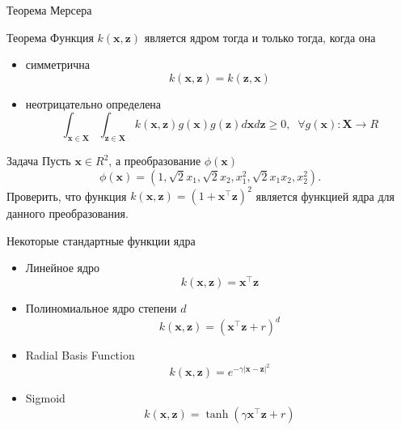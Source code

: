 \documentclass[aspectratio=169]{beamer}
\begin{document}
\begin{frame}{Теорема Мерсера}

\begin{alertblock}{Теорема}
Функция $k(\mathbf x, \mathbf z)$ является ядром тогда и только тогда, когда она 
\begin{itemize}
\item симметрична 
\[
k(\mathbf x, \mathbf z) = k(\mathbf z, \mathbf x)
\]
\item неотрицательно определена
\[
\int_{\mathbf x \in \mathbf X} \int_{\mathbf z \in \mathbf X} k(\mathbf x, \mathbf z) g(\mathbf x) g(\mathbf z) d\mathbf x d\mathbf z \geqslant 0, \;\; \forall g(\mathbf{x}): \mathbf{X} \rightarrow R
\]
\end{itemize}
\end{alertblock}

\begin{block}{Задача}
Пусть $\mathbf x \in R^2$, а преобразование $\phi(\mathbf{x})$
\[
\phi(\mathbf{x}) = (1, \sqrt{2} x_1, \sqrt{2} x_2, x_1^2, \sqrt{2} x_1 x_2, x_2^2).
\]
Проверить, что функция $k(\mathbf{x}, \mathbf{z}) = (1 + \mathbf x^\top \mathbf z)^2$ является функцией ядра для данного преобразования.
\end{block}

\end{frame}

\begin{frame}{Некоторые стандартные функции ядра}

\begin{itemize}
\item Линейное ядро
\[
k(\mathbf{x}, \mathbf{z}) = \mathbf{x}^\top\mathbf{z}
\]
\item Полиномиальное ядро степени $d$
\[
k(\mathbf{x}, \mathbf{z}) = (\mathbf{x}^\top\mathbf{z} + r)^d
\]
\item Radial Basis Function
\[
k(\mathbf{x}, \mathbf{z}) = e^{-\gamma |\mathbf x - \mathbf z|^2}
\]
\item Sigmoid
\[
k(\mathbf{x}, \mathbf{z}) = \tanh (\gamma \mathbf{x}^\top\mathbf{z} + r)
\]

\end{itemize}

\end{frame}
\end{document}
